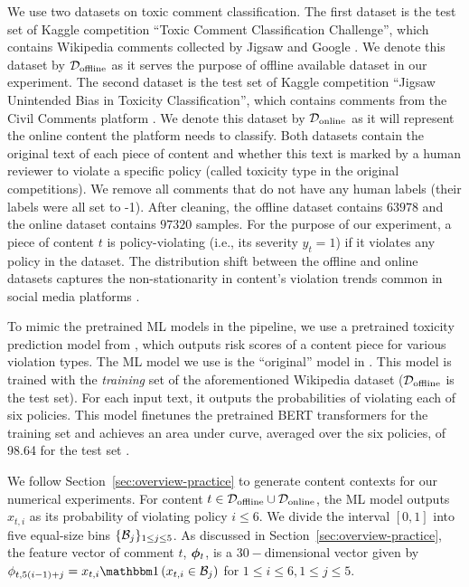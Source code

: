 We use two datasets on toxic comment classification. The first dataset is the test set of Kaggle competition ``Toxic Comment Classification Challenge'', which contains Wikipedia comments collected by Jigsaw and Google \citep{dataset-wiki}. We denote this dataset by $\mathcal{D}_{\text{offline}}$ as it serves the purpose of offline available dataset in our experiment. The second dataset is the test set of Kaggle competition ``Jigsaw Unintended Bias in Toxicity Classification'', which contains comments from the Civil Comments platform \citep{dataset-civil}. We denote this dataset by $\mathcal{D}_{\text{online}}$ as it will represent the online content the platform needs to classify. Both datasets contain the original text of each piece of content and whether this text is marked by a human reviewer to violate a specific policy (called toxicity type in the original competitions). We remove all comments that do not have any human labels (their labels were all set to -1). After cleaning, the offline dataset contains $63978$ and the online dataset contains $97320$ samples. For the purpose of our experiment, a piece of content $t$ is policy-violating (i.e., its severity $y_t = 1$) if it violates any policy in the dataset. The distribution shift between the offline and online datasets captures the non-stationarity in content's violation trends common in social media platforms \citep{Avadhanula2022}.

 To mimic the pretrained ML models in the pipeline, we use a pretrained toxicity prediction model from \cite{detoxify}, which outputs risk scores of a content piece for various violation types. The ML model we use is the ``original'' model in \cite{detoxify}. This model is trained with the \emph{training} set of the aforementioned Wikipedia dataset ($\mathcal{D}_{\text{offline}}$ is the test set). For each input text, it outputs the probabilities of violating each of six policies. This model finetunes the pretrained BERT transformers \cite{devlin2019bert} for the training set and achieves an area under curve, averaged over the six policies, of 98.64 for the test set \citep{detoxify}. 

We follow Section~\ref{sec:overview-practice} to generate content contexts for our numerical experiments. For content $t \in \mathcal{D}_{\text{offline}} \cup \mathcal{D}_{\text{online}}$, the ML model outputs $x_{t,i}$ as its probability of violating policy $i \leq 6$. We divide the interval $[0,1]$ into five equal-size bins $\{\mathcal{B}_j\}_{1 \leq j \leq 5}$. As discussed in Section~\ref{sec:overview-practice}, the feature vector of comment $t$, $\boldsymbol{\phi}_t$, is a $30-$dimensional vector given by $\phi_{t,5(i-1)+j} = x_{t,i}\indic{x_{t,i} \in \set{B}_j}$ for $1 \leq i \leq 6, 1 \leq j \leq 5$.

